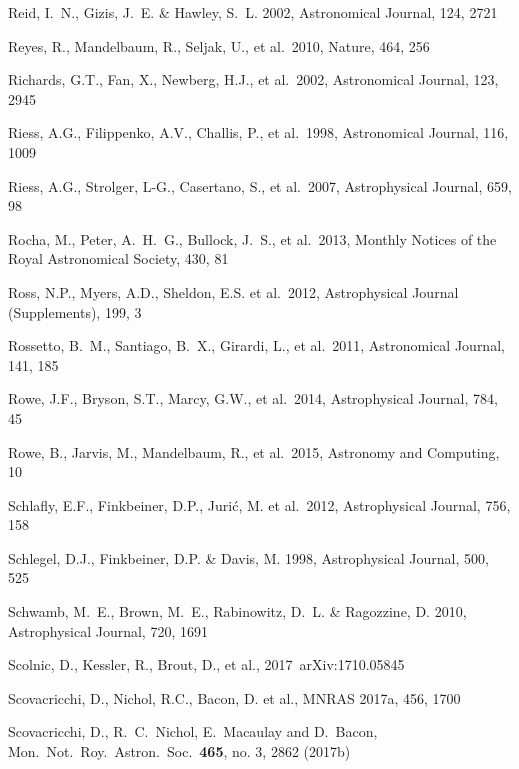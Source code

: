 \documentclass[twocolumn]{aastex61}
\begin{document}
\begin{thebibliography}{}
 Reid, I.~N., Gizis, J.~E. \& Hawley, S.~L. 2002,  Astronomical Journal, 124, 2721

 Reyes, R., Mandelbaum, R., Seljak, U., et al.~2010, Nature, 464, 256

 Richards, G.T., Fan, X., Newberg, H.J., et al.~2002, Astronomical Journal, 123, 2945

 Riess, A.G., Filippenko, A.V., Challis, P., et al.~1998, Astronomical Journal, 116, 1009

 Riess, A.G., Strolger, L-G., Casertano, S., et al.~2007, Astrophysical Journal, 659, 98

 Rocha, M., Peter, A.~H.~G., Bullock, J.~S., et al.\ 2013, Monthly Notices of the Royal Astronomical Society, 430, 81

 Ross, N.P., Myers, A.D., Sheldon, E.S. et al.~2012, Astrophysical Journal (Supplements), 199, 3

 Rossetto, B.~M., Santiago, B.~X., Girardi, L., et al.~2011, Astronomical Journal, 141, 185

 Rowe, J.F., Bryson, S.T., Marcy, G.W., et al.~2014, Astrophysical Journal, 784, 45

 Rowe, B., Jarvis, M., Mandelbaum, R., et al.~2015, Astronomy and Computing,  10

 Schlafly, E.F., Finkbeiner, D.P., Juri\'c, M. et al.~2012, Astrophysical Journal, 756, 158

 Schlegel, D.J., Finkbeiner, D.P. \& Davis, M. 1998, Astrophysical Journal, 500, 525

 Schwamb, M.~E., Brown, M.~E., Rabinowitz, D.~L. \& Ragozzine, D. 2010, Astrophysical Journal, 720, 1691

 Scolnic, D., Kessler, R., Brout, D., et al., 2017~arXiv:1710.05845

 Scovacricchi, D., Nichol, R.C., Bacon, D. et al., MNRAS 2017a, 456, 1700

 Scovacricchi, D., R.~C.~Nichol, E.~Macaulay and D.~Bacon, Mon.\ Not.\ Roy.\ Astron.\ Soc.\  {\bf 465}, no. 3, 2862 (2017b)


\end{thebibliography}
\end{document}

